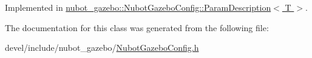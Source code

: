 Implemented in \hyperlink{classnubot__gazebo_1_1NubotGazeboConfig_1_1ParamDescription_adc6e0d0145a31279a11a8df353889de4}{nubot\-\_\-gazebo\-::\-Nubot\-Gazebo\-Config\-::\-Param\-Description$<$ T $>$}.



The documentation for this class was generated from the following file\-:\begin{DoxyCompactItemize}
\item 
devel/include/nubot\-\_\-gazebo/\hyperlink{NubotGazeboConfig_8h}{Nubot\-Gazebo\-Config.\-h}\end{DoxyCompactItemize}
